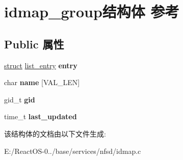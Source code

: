 \hypertarget{structidmap__group}{}\section{idmap\+\_\+group结构体 参考}
\label{structidmap__group}
\subsection*{Public 属性}
\begin{DoxyCompactItemize}
\item 
\mbox{\label{structidmap__group_ae7d2386b8c866f6e8a1fc7fad2792f44}} 
\hyperlink{interfacestruct}{struct} \hyperlink{structlist__entry}{list\+\_\+entry} {\bfseries entry}
\item 
\mbox{\label{structidmap__group_a0e861608f1d331ccc4bf6e423685d230}} 
char {\bfseries name} \mbox{[}V\+A\+L\+\_\+\+L\+EN\mbox{]}
\item 
\mbox{\label{structidmap__group_a409beaebea95dc4691193e0e12853155}} 
gid\+\_\+t {\bfseries gid}
\item 
\mbox{\label{structidmap__group_a8533e2c0e329fe654229f68051f14416}} 
time\+\_\+t {\bfseries last\+\_\+updated}
\end{DoxyCompactItemize}


该结构体的文档由以下文件生成\+:\begin{DoxyCompactItemize}
\item 
E\+:/\+React\+O\+S-\/0../base/services/nfsd/idmap.\+c\end{DoxyCompactItemize}
